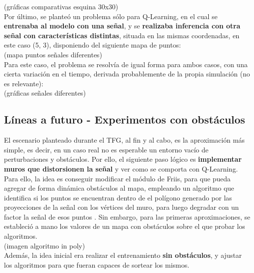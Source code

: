 (gráficas comparativas esquina 30x30)\\

Por último, se planteó un problema sólo para Q-Learning, en el cual se \textbf{entrenaba al modelo con una señal}, y se \textbf{realizaba inferencia con otra señal con características distintas}, situada en las mismas coordenadas, en este caso (5, 3), disponiendo del siguiente mapa de puntos:\\

(mapa puntos señales diferentes)\\

Para este caso, el problema se resolvía de igual forma para ambos casos, con una cierta variación en el tiempo, derivada probablemente de la propia simulación (no es relevante):\\

(gráficas señales diferentes)\\

\subsection{Líneas a futuro - Experimentos con obstáculos}
\label{subsec:experimentos_obstaculos}

El escenario planteado durante el \ac{TFG}, al fin y al cabo, es la aproximación más simple, es decir, en un caso real no es esperable un entorno vacío de perturbaciones y obstáculos. Por ello, el siguiente paso lógico es \textbf{implementar muros que distorsionen la señal} y ver como se comporta con Q-Learning.\\

Para ello, la idea es conseguir modificar el módulo de Friis, para que pueda agregar de forma dinámica obstáculos al mapa, empleando un algoritmo que identifica si los puntos se encuentran dentro de el polígono generado por las proyecciones de la señal con los vértices del muro, para luego degradar con un factor la señal de esos puntos \cite{poly-info}. Sin embargo, para las primeras aproximaciones, se estableció a mano los valores de un mapa con obstáculos sobre el que probar los algoritmos.\\

(imagen algoritmo in poly)\\

Además, la idea inicial era realizar el entrenamiento \textbf{sin obstáculos}, y ajustar los algoritmos para que fueran capaces de sortear los mismos.\\

